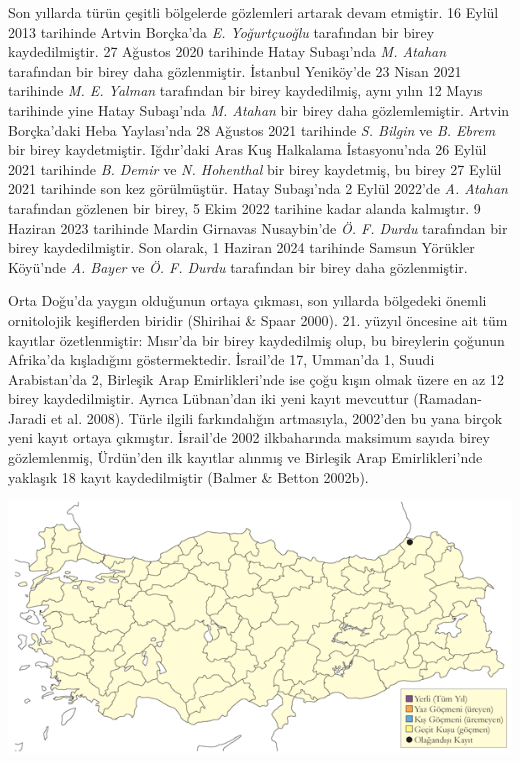 \documentclass[
  letterpaper,
  DIV=11,
  numbers=noendperiod]{scrreprt}
\begin{document}
Son yıllarda türün çeşitli bölgelerde gözlemleri artarak devam etmiştir.
16 Eylül 2013 tarihinde Artvin Borçka'da \emph{E. Yoğurtçuoğlu}
tarafından bir birey kaydedilmiştir. 27 Ağustos 2020 tarihinde Hatay
Subaşı'nda \emph{M. Atahan} tarafından bir birey daha gözlenmiştir.
İstanbul Yeniköy'de 23 Nisan 2021 tarihinde \emph{M. E. Yalman}
tarafından bir birey kaydedilmiş, aynı yılın 12 Mayıs tarihinde yine
Hatay Subaşı'nda \emph{M. Atahan} bir birey daha gözlemlemiştir. Artvin
Borçka'daki Heba Yaylası'nda 28 Ağustos 2021 tarihinde \emph{S. Bilgin}
ve \emph{B. Ebrem} bir birey kaydetmiştir. Iğdır'daki Aras Kuş Halkalama
İstasyonu'nda 26 Eylül 2021 tarihinde \emph{B. Demir} ve \emph{N.
Hohenthal} bir birey kaydetmiş, bu birey 27 Eylül 2021 tarihinde son kez
görülmüştür. Hatay Subaşı'nda 2 Eylül 2022'de \emph{A. Atahan}
tarafından gözlenen bir birey, 5 Ekim 2022 tarihine kadar alanda
kalmıştır. 9 Haziran 2023 tarihinde Mardin Girnavas Nusaybin'de \emph{Ö.
F. Durdu} tarafından bir birey kaydedilmiştir. Son olarak, 1 Haziran
2024 tarihinde Samsun Yörükler Köyü'nde \emph{A. Bayer} ve \emph{Ö. F.
Durdu} tarafından bir birey daha gözlenmiştir.

Orta Doğu'da yaygın olduğunun ortaya çıkması, son yıllarda bölgedeki
önemli ornitolojik keşiflerden biridir (Shirihai \& Spaar 2000). 21.
yüzyıl öncesine ait tüm kayıtlar özetlenmiştir: Mısır'da bir birey
kaydedilmiş olup, bu bireylerin çoğunun Afrika'da kışladığını
göstermektedir. İsrail'de 17, Umman'da 1, Suudi Arabistan'da 2, Birleşik
Arap Emirlikleri'nde ise çoğu kışın olmak üzere en az 12 birey
kaydedilmiştir. Ayrıca Lübnan'dan iki yeni kayıt mevcuttur
(Ramadan-Jaradi et al. 2008). Türle ilgili farkındalığın artmasıyla,
2002'den bu yana birçok yeni kayıt ortaya çıkmıştır. İsrail'de 2002
ilkbaharında maksimum sayıda birey gözlemlenmiş, Ürdün'den ilk kayıtlar
alınmış ve Birleşik Arap Emirlikleri'nde yaklaşık 18 kayıt
kaydedilmiştir (Balmer \& Betton 2002b).

\includegraphics{images/harita_Page_086.png}
\end{document}
